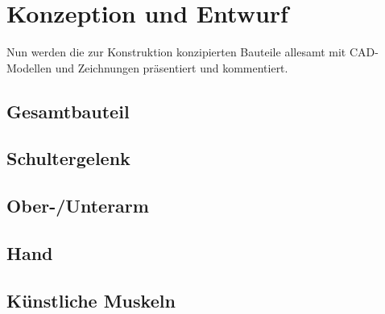 \chapter{Konzeption und Entwurf}

	Nun werden die zur Konstruktion konzipierten Bauteile allesamt mit CAD-Modellen und Zeichnungen präsentiert und kommentiert.

\section{Gesamtbauteil}


\section{Schultergelenk}


\section{Ober-/Unterarm}


\section{Hand}


\section{Künstliche Muskeln}
